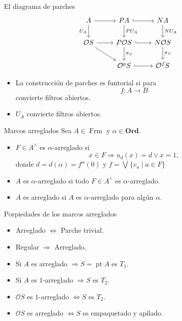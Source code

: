 \documentclass[compress,12pt]{beamer}
\DeclareMathOperator{\pt}{pt}
\DeclareMathOperator{\Frm}{Frm}
\begin{document}
\begin{frame}[fragile]{El diagrama de parches}
\begin{equation}\label{Diagrama de parches}
\begin{tikzcd}
	A & PA & NA \\
	{\mathcal{O}S} & {P\mathcal{O}S} & {N\mathcal{O}S} \\
	& {\mathcal{O}^pS} & {\mathcal{O}^fS}
	\arrow[from=1-1, to=1-2]
	\arrow["{U_A}"', from=1-1, to=2-1]
	\arrow[hook, from=1-2, to=1-3]
	\arrow["{PU_A}", from=1-2, to=2-2]
	\arrow["{NU_A}", from=1-3, to=2-3]
	\arrow[from=2-1, to=2-2]
	\arrow[from=2-1, to=3-2]
	\arrow[hook, from=2-2, to=2-3]
	\arrow["{\pi_S}", from=2-2, to=3-2]
	\arrow["{\sigma_S}", from=2-3, to=3-3]
	\arrow[hook, from=3-2, to=3-3]
\end{tikzcd}
\end{equation}
\begin{itemize}
	\item La construcción de parches es funtorial si para
\[
f\colon A\to B
\]
convierte filtros abiertos.
\item $U_A$ convierte filtros abiertos.
\end{itemize}
\end{frame}

\begin{frame}{Marcos arreglados}
Sea $A\in \Frm$ y $\alpha\in \mathbf{Ord}$. 
    \begin{itemize}
        \item $F\in A^\wedge$ es $\alpha$-arreglado si 
    \[
    x\in F\Rightarrow u_d(x)=d\vee x=1,
    \]
    donde $d=d(\alpha)=f^\alpha(0)$ y $f=\dot{\bigvee}\{v_a\mid a\in F\}$
    \item $A$ es $\alpha$-arreglado si todo $F\in A^\wedge$ es $\alpha$-arreglado.
    \item $A$ es arreglado si $A$ es $\alpha$-arreglado para algún $\alpha$.
    \end{itemize}
\end{frame}

\begin{frame}{Porpiedades de los marcos arreglados}
\begin{itemize}
	\item Arreglado $\Leftrightarrow$ Parche trivial.
	\item Regular $\Rightarrow$ Arreglado.
	\item Si $A$ es arreglado $\Rightarrow S=\pt A$ es $T_1$.
	\item Si $A$ es $1$-arreglado $\Rightarrow S$ es $T_2$.
	\item $\mathcal{O}S$ es $1$-arreglado $\Leftrightarrow S$ es $T_2$.
	\item $\mathcal{O}S$ es arreglado $\Leftrightarrow S$ es empaquetado y apilado.  
\end{itemize}
\end{frame}
\end{document}
